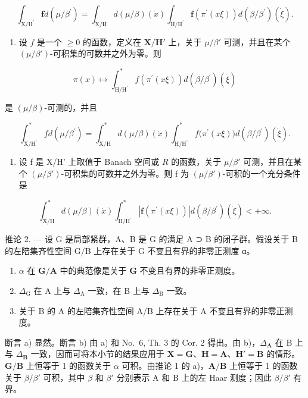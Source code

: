 \[
\int_ {\mathrm{X} / \mathrm{H} ^ {\prime}} \mathbf {f} d (\mu / \beta^ {\prime}) = \int_ {\mathrm{X} / \mathrm{H}} d (\mu / \beta) (\dot {x}) \int_ {\mathrm{H} / \mathrm{H} ^ {\prime}} \mathbf {f} \left(\pi^ {\prime} (x \xi)\right) d (\beta / \beta^ {\prime}) (\dot {\xi}).
\]

\begin{enumerate}
\def\labelenumi{\alph{enumi})}
\setcounter{enumi}{1}
\tightlist
\item
  设 \(f\) 是一个 \(\geqslant 0\) 的函数，定义在 \(\mathbf{X} / \mathbf{H}'\) 上，关于 \(\mu / \beta'\) 可测，并且在某个 \((\mu / \beta')\)-可积集的可数并之外为零。则
\end{enumerate}

\[
\pi (x) \mapsto \int_ {\mathrm{H} / \mathrm{H} ^ {\prime}} ^ {*} f (\pi^ {\prime} (x \xi)) d (\beta / \beta^ {\prime}) (\dot {\xi})
\]

是 \((\mu /\beta)\)-可测的，并且

\[
\int_ {\mathrm {X/ H^ {\prime}}} ^ {*} f d (\mu / \beta^ {\prime}) = \int_ {\mathrm{X/H}} ^ {*} d (\mu / \beta) (\dot {x}) \int_ {\mathrm {H/ H^ {\prime}}} ^ {*} f \bigl (\pi^ {\prime} (x \xi) \bigr) d (\beta / \beta^ {\prime}) (\dot {\xi}).
\]

\begin{enumerate}
\def\labelenumi{\alph{enumi})}
\setcounter{enumi}{2}
\tightlist
\item
  设 f 是 X/H' 上取值于 Banach 空间或 \(\overline{R}\) 的函数，关于 \(\mu/\beta'\) 可测，并且在某个 \((\mu/\beta')\)-可积集的可数并之外为零。则 f 为 \((\mu/\beta')\)-可积的一个充分条件是
\end{enumerate}

\[
\int_ {\mathrm{X} / \mathrm{H}} ^ {*} d (\mu / \beta) (\dot {x}) \int_ {\mathrm{H} / \mathrm{H} ^ {\prime}} ^ {*} | \mathbf {f} (\pi^ {\prime} (x \xi)) | d (\beta / \beta^ {\prime}) (\dot {\xi}) <   + \infty .
\]

推论 2. --- 设 G 是局部紧群，A、B 是 G 的满足 A ⊃ B 的闭子群。假设关于 B 的左陪集齐性空间 G/B 上存在关于 G 不变且有界的非零正测度 α。

\begin{enumerate}
\def\labelenumi{\alph{enumi})}
\item
  \(\alpha\) 在 \(\mathbf{G} / \mathbf{A}\) 中的典范像是关于 \(\mathbf{G}\) 不变且有界的非零正测度。
\item
  \(\Delta_{\mathrm{G}}\) 在 A 上与 \(\Delta_{\mathrm{A}}\) 一致，在 B 上与 \(\Delta_{\mathrm{B}}\) 一致。
\item
  关于 B 的 A 的左陪集齐性空间 A/B 上存在关于 A 不变且有界的非零正测度。
\end{enumerate}

断言 a) 显然。断言 b) 由 a) 和 No.~6, Th. 3 的 Cor. 2 得出。由 b)，\(\Delta_{\mathbf{A}}\) 在 B 上与 \(\Delta_{\mathbf{B}}\) 一致，因而可将本小节的结果应用于 \(\mathbf{X} = \mathbf{G}\)、\(\mathbf{H} = \mathbf{A}\)、\(\mathbf{H}' = \mathbf{B}\) 的情形。\(\mathbf{G} / \mathbf{B}\) 上恒等于 1 的函数关于 \(\alpha\) 可积。由推论 1 的 a)，\(\mathbf{A} / \mathbf{B}\) 上恒等于 1 的函数关于 \(\beta / \beta'\) 可积，其中 \(\beta\) 和 \(\beta'\) 分别表示 A 和 B 上的左 Haar 测度；因此 \(\beta / \beta'\) 有界。

